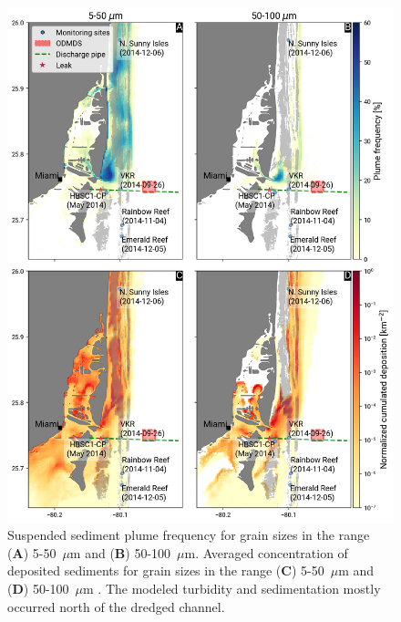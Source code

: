 \documentclass[preprint,12pt,authoryear]{elsarticle}
\begin{document}
\begin{figure}
	\centering
	\includegraphics[width=.9\textwidth]{figures/fig2_stokes4_symmetrical.png}
    \caption{Suspended sediment plume frequency for grain sizes in the range (\textbf{A}) 5-50~$\mu$m and (\textbf{B}) 50-100~$\mu$m. Averaged concentration of deposited sediments for grain sizes in the range (\textbf{C}) 5-50~$\mu$m and (\textbf{D}) 50-100~$\mu$m . The modeled turbidity and sedimentation mostly occurred north of the dredged channel.}
	\label{fig:onset_depo}
\end{figure}
\end{document}
